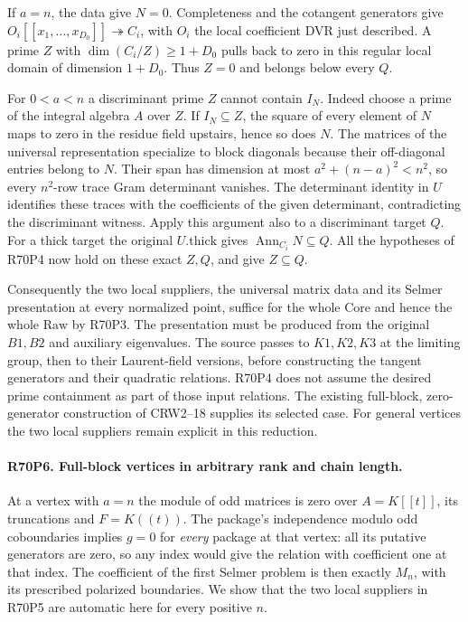 If $a=n$, the data give $N=0$. Completeness and the cotangent
generators give $O_i[[x_1,\ldots,x_{D_0}]]\twoheadrightarrow C_i$,
with $O_i$ the local coefficient DVR just described. A prime
$Z$ with $\dim(C_i/Z)\ge1+D_0$ pulls back to zero in this
regular local domain of dimension $1+D_0$. Thus $Z=0$ and
belongs below every $Q$.

For $0<a<n$ a discriminant prime $Z$ cannot contain $I_N$.
Indeed choose a prime of the integral algebra $A$ over $Z$.
If $I_N\subseteq Z$, the square of every element of $N$ maps
to zero in the residue field upstairs, hence so does $N$.
The matrices of the universal representation specialize to
block diagonals because their off-diagonal entries belong to $N$.
Their span has dimension at most $a^2+(n-a)^2<n^2$, so every
$n^2$-row trace Gram determinant vanishes. The determinant
identity in $U$ identifies these traces with the coefficients
of the given determinant, contradicting the discriminant witness.
Apply this argument also to a discriminant target $Q$. For
a thick target the original $U.\mathrm{thick}$ gives
$\operatorname{Ann}_{C_i} N\subseteq Q$. All the hypotheses
of R70P4 now hold on these exact $Z,Q$, and give $Z\subseteq Q$.

Consequently the two local suppliers, the universal matrix data
and its Selmer presentation at every normalized point, suffice
for the whole $\mathrm{Core}$ and hence the whole $\mathrm{Raw}$
by R70P3. The presentation must be produced from the original
$B1,B2$ and auxiliary eigenvalues. The source passes to $K1,K2,K3$
at the limiting group, then to their Laurent-field versions, before
constructing the tangent generators and their quadratic relations.
R70P4 does not assume the desired prime containment as part of
those input relations. The existing full-block, zero-generator
construction of CRW2--18 supplies its selected case. For general
vertices the two local suppliers remain explicit in this reduction.

\paragraph{R70P6. Full-block vertices in arbitrary rank and chain length.}
At a vertex with $a=n$ the module of odd matrices is zero over
$A=K[[t]]$, its truncations and $F=K((t))$. The package's
independence modulo odd coboundaries implies $g=0$ for
\emph{every} package at that vertex: all its putative generators
are zero, so any index would give the relation with coefficient
one at that index. The coefficient of the first Selmer problem is
then exactly $M_n$, with its prescribed polarized boundaries.
We show that the two local suppliers in R70P5 are automatic here
for every positive $n$.

